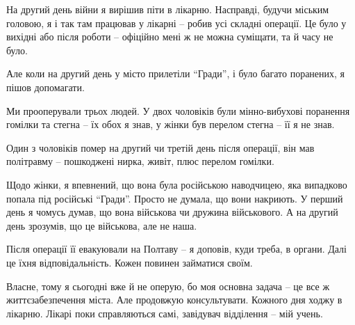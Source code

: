 На другий день війни я вирішив піти в лікарню. Насправді, будучи міським
головою, я і так там працював у лікарні – робив усі складні операції. Це було у
вихідні або після роботи – офіційно мені ж не можна суміщати, та й часу не
було.

Але коли на другий день у місто прилетіли \enquote{Гради}, і було багато
поранених, я пішов допомагати.

Ми прооперували трьох людей. У двох чоловіків були мінно-вибухові поранення
гомілки та стегна – їх обох я знав, у жінки був перелом стегна – її я не знав.

Один з чоловіків помер на другий чи третій день після операції, він мав
політравму – пошкоджені нирка, живіт, плюс перелом гомілки.

Щодо жінки, я впевнений, що вона була російською наводчицею, яка випадково
попала під російські \enquote{Гради}. Просто не думала, що вони накриють. У перший день
я чомусь думав, що вона військова чи дружина військового. А на другий день
зрозумів, що це військова, але не наша.

Після операції її евакуювали на Полтаву – я доповів, куди треба, в органи. Далі
це їхня відповідальність. Кожен повинен займатися своїм.

Власне, тому я сьогодні вже й не оперую, бо моя основна задача – це все ж
життєзабезпечення міста. Але продовжую консультувати. Кожного дня ходжу в
лікарню. Лікарі поки справляються самі, завідувач відділення – мій учень.
